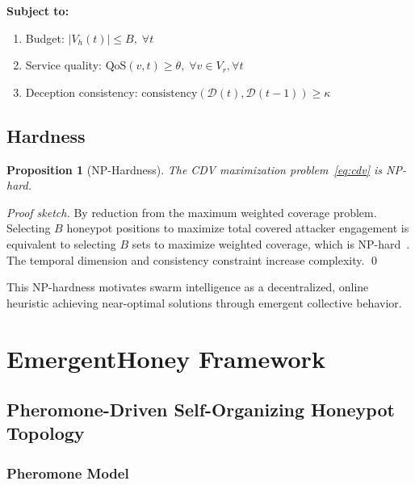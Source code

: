\documentclass[review,3p,twocolumn]{elsarticle}
\newtheorem{proposition}[theorem]{Proposition}
\newcommand{\calD}{\mathcal{D}}
\newcommand{\Vh}{V_h}
\newcommand{\Vr}{V_r}
\newcommand{\QoS}{\mathrm{QoS}}
\begin{document}
\textbf{Subject to:}
\begin{enumerate}[label=(\arabic*)]
\item Budget: $|\Vh(t)| \leq B, \; \forall t$
\item Service quality: $\QoS(v, t) \geq \theta, \; \forall v \in \Vr, \forall t$
\item Deception consistency: $\mathrm{consistency}(\calD(t), \calD(t{-}1)) \geq \kappa$
\end{enumerate}

\subsection{Hardness}

\begin{proposition}[NP-Hardness]
\label{prop:hardness}
The CDV maximization problem~\eqref{eq:cdv} is NP-hard.
\end{proposition}

\begin{proof}[Proof sketch]
By reduction from the maximum weighted coverage problem. Selecting $B$ honeypot positions to maximize total covered attacker engagement is equivalent to selecting $B$ sets to maximize weighted coverage, which is NP-hard~\cite{karp1972reducibility}. The temporal dimension and consistency constraint increase complexity. \qed
\end{proof}

This NP-hardness motivates swarm intelligence as a decentralized, online heuristic achieving near-optimal solutions through emergent collective behavior.


\section{EmergentHoney Framework}
\label{sec:framework}

\subsection{Pheromone-Driven Self-Organizing Honeypot Topology}
\label{sec:framework:topology}

\subsubsection{Pheromone Model}
\end{document}
